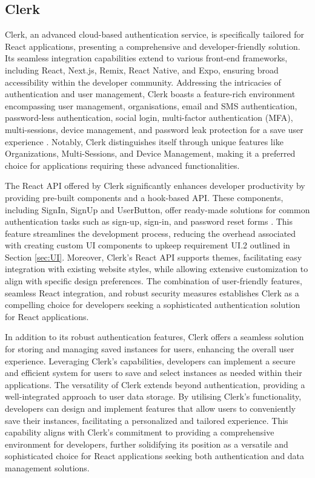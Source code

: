 \documentclass{l4proj}
\begin{document}
\subsection{Clerk}
\label{sec:clerk}

Clerk, an advanced cloud-based authentication service, is specifically tailored for React applications, presenting a comprehensive and developer-friendly solution. Its seamless integration capabilities extend to various front-end frameworks, including React, Next.js, Remix, React Native, and Expo, ensuring broad accessibility within the developer community. Addressing the intricacies of authentication and user management, Clerk boasts a feature-rich environment encompassing user management, organisations, email and SMS authentication, password-less authentication, social login, multi-factor authentication (MFA), multi-sessions, device management, and password leak protection for a save user experience \citep{Grant_2023}. Notably, Clerk distinguishes itself through unique features like Organizations, Multi-Sessions, and Device Management, making it a preferred choice for applications requiring these advanced functionalities.

The React API offered by Clerk significantly enhances developer productivity by providing pre-built components and a hook-based API. These components, including SignIn, SignUp and UserButton, offer ready-made solutions for common authentication tasks such as sign-up, sign-in, and password reset forms \citep{Clerk}. This feature streamlines the development process, reducing the overhead associated with creating custom UI components to upkeep requirement UI.2 outlined in Section \ref{sec:UI}. Moreover, Clerk's React API supports themes, facilitating easy integration with existing website styles, while allowing extensive customization to align with specific design preferences. The combination of user-friendly features, seamless React integration, and robust security measures establishes Clerk as a compelling choice for developers seeking a sophisticated authentication solution for React applications.

In addition to its robust authentication features, Clerk offers a seamless solution for storing and managing saved instances for users, enhancing the overall user experience. Leveraging Clerk's capabilities, developers can implement a secure and efficient system for users to save and select instances as needed within their applications. The versatility of Clerk extends beyond authentication, providing a well-integrated approach to user data storage. By utilising Clerk's functionality, developers can design and implement features that allow users to conveniently save their instances, facilitating a personalized and tailored experience. This capability aligns with Clerk's commitment to providing a comprehensive environment for developers, further solidifying its position as a versatile and sophisticated choice for React applications seeking both authentication and data management solutions.
\end{document}
